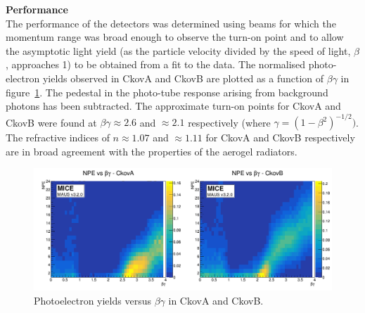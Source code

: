 \noindent\textbf{Performance} \\
\noindent
The performance of the detectors was determined using beams for which
the momentum range was broad enough to observe the turn-on point and to
allow the asymptotic light yield (as the particle velocity divided by the speed of light, $\beta$, approaches 1) to be
obtained from a fit to the data.
The normalised photo-electron yields observed in CkovA and CkovB are
plotted as a function of $\beta\gamma$ in
figure~\ref{fig:ckov_betagamma}.
The pedestal in the photo-tube response arising from background
photons has been subtracted.
The approximate turn-on points for CkovA and CkovB were found at
$\beta\gamma \approx 2.6$ and $\approx 2.1$ respectively
(where $\gamma=(1-\beta^2)^{-1/2} )$.
The refractive indices of $n \approx 1.07$ and $\approx 1.11$ for
CkovA and CkovB respectively are in broad agreement with the
properties of the aerogel radiators. 
\begin{figure}
  \begin{center}
    \includegraphics[width=0.90\columnwidth]{./03-Ckov/Figures/scatter_betagamma_logo.png}
    \caption{Photoelectron yields versus $\beta\gamma$ in CkovA and CkovB.}
    \label{fig:ckov_betagamma}
  \end{center}
\end{figure}
